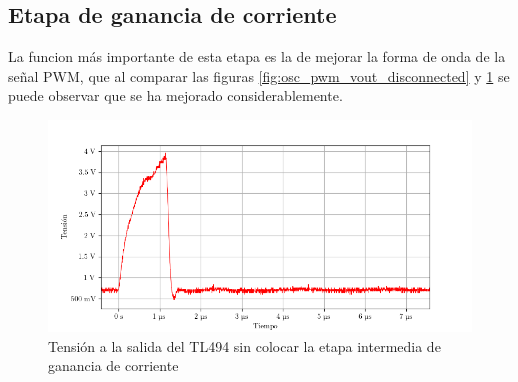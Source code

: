 


\subsection{Etapa de ganancia de corriente}





La funcion más importante de esta etapa es la de mejorar la forma de onda de la señal PWM, que al comparar las figuras \ref{fig:osc_pwm_vout_disconnected} y \ref{fig:pwm_vout_sin_bjt} se puede observar que se ha mejorado considerablemente.

\begin{figure}[H]
    \centering
    \includegraphics[width=\textwidth]{images/capturas-osciloscopio/TL494/pwm_vout_sin_bjt.png}
    \caption{Tensión a la salida del TL494 sin colocar la etapa intermedia de ganancia de corriente}
    \label{fig:pwm_vout_sin_bjt}
\end{figure}

